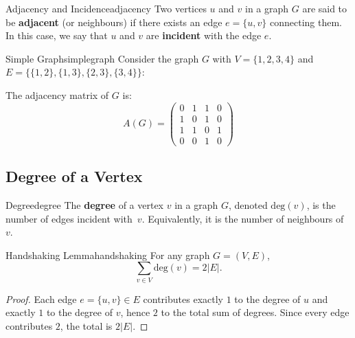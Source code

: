 \documentclass[11pt,a4paper]{scrartcl}
\renewcommand{\deg}{\mathrm{deg}}        %
\begin{document}
\begin{definition}{Adjacency and Incidence}{adjacency}
Two vertices $u$ and $v$ in a graph $G$ are said to be \textbf{adjacent} (or neighbours) if there exists an edge $e = \{u, v\}$ connecting them. In this case, we say that $u$ and $v$ are \textbf{incident} with the edge $e$.
\end{definition}

\begin{example}{Simple Graph}{simplegraph}
Consider the graph $G$ with $V = \{1, 2, 3, 4\}$ and $E = \{\{1,2\}, \{1,3\}, \{2,3\}, \{3,4\}\}$:

\begin{center}
\end{center}

The adjacency matrix of $G$ is:
\[
A(G) = \begin{pmatrix}
0 & 1 & 1 & 0 \\
1 & 0 & 1 & 0 \\
1 & 1 & 0 & 1 \\
0 & 0 & 1 & 0
\end{pmatrix}
\]
\end{example}

\subsection{Degree of a Vertex}

\begin{definition}{Degree}{degree}
The \textbf{degree} of a vertex $v$ in a graph $G$, denoted $\deg(v)$, is the number of edges incident with~$v$. Equivalently, it is the number of neighbours of~$v$.
\end{definition}

\begin{theorem}{Handshaking Lemma}{handshaking}
For any graph $G = (V, E)$,
\[
  \sum_{v \in V} \deg(v) = 2|E|.
\]
\end{theorem}

\begin{proof}
Each edge $e = \{u, v\} \in E$ contributes exactly $1$ to the degree of $u$ and exactly $1$ to the degree of $v$, hence $2$ to the total sum of degrees. Since every edge contributes $2$, the total is $2|E|$.
\end{proof}
\end{document}
